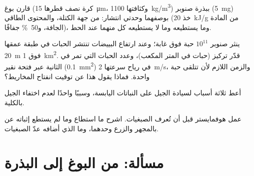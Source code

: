 \begin{exercise}[$\star\star$]\label{exo:b2:plant-life-cycles:9}
قارن بوغ  (كرة نصف قطرها \qty{15}{\micro m}، وكثافتها
\qty{1100}{kg/m^3}) ببذرة صنوبر (\qty{5}{mg}) بوصفهما وحدتي انتشار:
من جهة الكتلة، والمحتوى الطاقي (خذ \qty{20}{kJ/g} من المادة الجافة،
و\qty{50}{\%} جفافًا)، وما يستطيعه وما لا يستطيعه كل منهما عند الحط.
\end{exercise}

\begin{exercise}[$\star\star\star$]\label{exo:b2:plant-life-cycles:10}
ينثر صنوبر $10^{11}$ حبة  فوق غابة؛ وعند ارتفاع البييضات تنتشر
الحبات في طبقة عمقها \qty{20}{m} فوق \qty{1}{km^2}. قدّر تركيز
 (حبات في المتر المكعب)، وعدد الحبات التي تمر في الثانية عبر
فتحة نقير  (\qty{0.1}{mm^2}) في رياح سرعتها \qty{2}{m/s}،
والزمن اللازم لأن تتلقى  حبة واحدة. فماذا يقول هذا عن توقيت
انفتاح المخاريط؟
\end{exercise}

\begin{exercise}[$\star\star\star$]\label{exo:b2:plant-life-cycles:11}
أعط ثلاثة أسباب لسيادة الجيل  على  النباتات
اليابسة، وسببًا واحدًا لعدم اختفاء الجيل  بالكلية.
\end{exercise}

\begin{exercise}[$\star\star\star$]\label{exo:b2:plant-life-cycles:12}
عمل هوفمايستر قبل أن تُعرف الصبغيات. اشرح ما استطاع وما لم يستطع
إثباته عن  بالمجهر والزرع وحدهما، وما الذي أضافه عدّ
الصبغيات.
\end{exercise}

\section{مسألة: من البوغ إلى البذرة}


